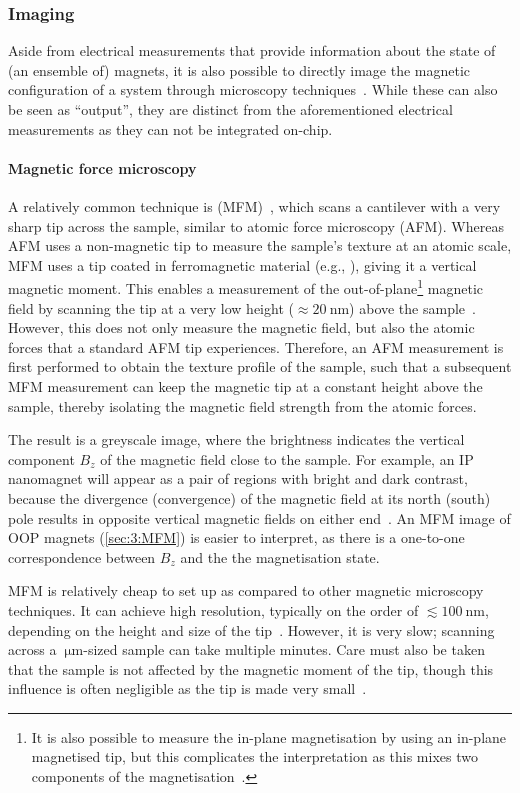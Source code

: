 \subsubsection{Imaging}
Aside from electrical measurements that provide information about the state of (an ensemble of) magnets, it is also possible to directly image the magnetic configuration of a system through microscopy techniques~\cite{freeman2001advances}.
While these can also be seen as ``output'', they are distinct from the aforementioned electrical measurements as they can not be integrated on-chip.

\paragraph{Magnetic force microscopy}
A relatively common technique is  (MFM)~\cite{MFM}, which scans a cantilever with a very sharp tip across the sample, similar to atomic force microscopy (AFM).
Whereas AFM uses a non-magnetic tip to measure the sample's texture at an atomic scale, MFM uses a tip coated in ferromagnetic material (e.g., ), giving it a vertical magnetic moment.
This enables a measurement of the out-of-plane\footnote{
	It is also possible to measure the in-plane magnetisation by using an in-plane magnetised tip, but this complicates the interpretation as this mixes two components of the magnetisation~\cite{MFM_inplane}.
} magnetic field by scanning the tip at a very low height ($\approx \SI{20}{\nano\metre}$) above the sample~\cite{NML_Carlton,JM_Masterproef}.
However, this does not only measure the magnetic field, but also the atomic forces that a standard AFM tip experiences.
Therefore, an AFM measurement is first performed to obtain the texture profile of the sample, such that a subsequent MFM measurement can keep the magnetic tip at a constant height above the sample, thereby isolating the magnetic field strength from the atomic forces. \par
The result is a greyscale image, where the brightness indicates the vertical component $B_z$ of the magnetic field close to the sample.
For example, an IP nanomagnet will appear as a pair of regions with bright and dark contrast, because the divergence (convergence) of the magnetic field at its north (south) pole results in opposite vertical magnetic fields on either end~\cite{NML_Carlton}.
An MFM image of OOP magnets (\cref{sec:3:MFM}) is easier to interpret, as there is a one-to-one correspondence between $B_z$ and the the magnetisation state. \par
MFM is relatively cheap to set up as compared to other magnetic microscopy techniques.
It can achieve high resolution, typically on the order of $\lesssim \SI{100}{\nano\metre}$, depending on the height and size of the tip~\cite{MFM}.
However, it is very slow; scanning across a $\SI{}{\micro\metre}$-sized sample can take multiple minutes.
Care must also be taken that the sample is not affected by the magnetic moment of the tip, though this influence is often negligible as the tip is made very small~\cite{Probing_MagnetoOptics}.

